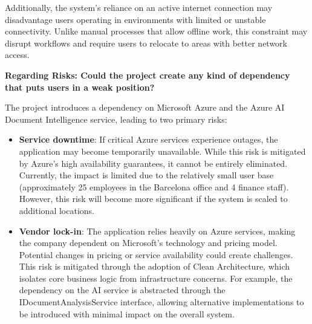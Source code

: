 Additionally, the system's reliance on an active internet connection may disadvantage users operating in environments with limited or unstable connectivity. Unlike manual processes that allow offline work, this constraint may disrupt workflows and require users to relocate to areas with better network access. 

\textbf{Regarding Risks: Could the project create any kind of dependency that puts users in a weak position?}

The project introduces a dependency on Microsoft Azure and the Azure AI Document Intelligence service, leading to two primary risks:

\begin{itemize} [leftmargin=0.75cm, noitemsep, label=$\bullet$]

    \item \textbf{Service downtime}: If critical Azure services experience outages, the application may become temporarily unavailable. While this risk is mitigated by Azure's high availability guarantees, it cannot be entirely eliminated. Currently, the impact is limited due to the relatively small user base (approximately 25 employees in the Barcelona office and 4 finance staff). However, this risk will become more significant if the system is scaled to additional locations.

    \item \textbf{Vendor lock-in}: The application relies heavily on Azure services, making the company dependent on Microsoft's technology and pricing model. Potential changes in pricing or service availability could create challenges. This risk is mitigated through the adoption of Clean Architecture, which isolates core business logic from infrastructure concerns. For example, the dependency on the AI service is abstracted through the IDocumentAnalysisService interface, allowing alternative implementations to be introduced with minimal impact on the overall system.
    
\end{itemize}

